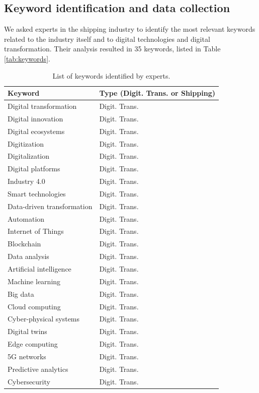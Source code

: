 \documentclass[a4paper, review, endfloat, authoryear]{elsarticle}
\begin{document}
	\subsection{Keyword identification and data collection}
	We asked experts in the shipping industry to identify the most relevant keywords related to the industry itself and to digital technologies and digital transformation. Their analysis resulted in 35 keywords, listed in Table \ref{tab:keywords}.
	
	\begin{table}[h]
		\centering
		\caption{List of keywords identified by experts.}
		\begin{tabularx}{\linewidth}{XX}
			\hline
			Keyword& Type (Digit. Trans. or Shipping) \\
			\hline
			Digital transformation & Digit. Trans. \\
			Digital innovation & Digit. Trans. \\
			Digital ecosystems & Digit. Trans. \\
			Digitization & Digit. Trans. \\
			Digitalization & Digit. Trans. \\
			Digital platforms & Digit. Trans. \\
			Industry 4.0 & Digit. Trans. \\
			Smart technologies & Digit. Trans. \\
			Data-driven transformation & Digit. Trans. \\
			Automation & Digit. Trans. \\
			Internet of Things & Digit. Trans. \\
			Blockchain & Digit. Trans. \\
			Data analysis & Digit. Trans. \\
			Artificial intelligence & Digit. Trans. \\
			Machine learning & Digit. Trans. \\
			Big data & Digit. Trans. \\
			Cloud computing & Digit. Trans. \\
			Cyber-physical systems & Digit. Trans. \\
			Digital twins & Digit. Trans. \\
			Edge computing & Digit. Trans. \\
			5G networks & Digit. Trans. \\
			Predictive analytics & Digit. Trans. \\
			Cybersecurity & Digit. Trans. \\

\end{tabularx}
\end{table}
\end{document}
